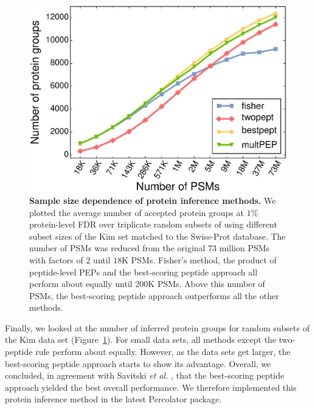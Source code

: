 \documentclass{article}
\begin{document}
\begin{figure}
\centering
\includegraphics[width=0.6\linewidth]
{./img/kim-downsampling-performance}
  \caption{{\bf Sample size dependence of protein inference methods.}
    We plotted the average number of accepted protein groups at $1\%$
    protein-level FDR over triplicate random subsets of using
    different subset sizes of the Kim set matched to the Swiss-Prot
    database.  The number of PSMs was reduced from the original $73$
    million PSMs with factors of $2$ until $18$K PSMs. Fisher's
    method, the product of peptide-level PEPs and the best-scoring
    peptide approach all perform about equally until $200$K
    PSMs. Above this number of PSMs, the best-scoring peptide approach
    outperforms all the other methods.}
  \label{fig:power-downsample}
\end{figure}

Finally, we looked at the number of inferred protein groups for random 
subsets of the Kim data set (Figure~\ref{fig:power-downsample}).  For 
small data sets, all methods except the two-peptide rule perform about 
equally. However, as the data sets get larger, the best-scoring 
peptide approach starts to show its advantage. Overall, we concluded, 
in agreement with Savitski {\em et al.} \cite{savitski2015scalable}, 
that the best-scoring peptide approach yielded the best overall 
performance. We therefore implemented this protein inference method in 
the latest Percolator package.

\end{document}
